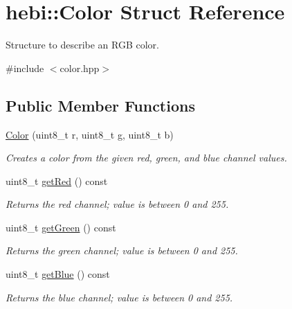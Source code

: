 \hypertarget{structhebi_1_1Color}{}\section{hebi\+:\+:Color Struct Reference}
\label{structhebi_1_1Color}


Structure to describe an R\+GB color.  




{\ttfamily \#include $<$color.\+hpp$>$}

\subsection*{Public Member Functions}
\begin{DoxyCompactItemize}
\item 
\hyperlink{structhebi_1_1Color_aa7cad37a99b993eea058d455bbcc4a82}{Color} (uint8\+\_\+t r, uint8\+\_\+t g, uint8\+\_\+t b)
\begin{DoxyCompactList}\small\item\em Creates a color from the given red, green, and blue channel values. \end{DoxyCompactList}\item 
uint8\+\_\+t \hyperlink{structhebi_1_1Color_a0f5728a26e280c12c89992db7d7731e3}{get\+Red} () const \hypertarget{structhebi_1_1Color_a0f5728a26e280c12c89992db7d7731e3}{}\label{structhebi_1_1Color_a0f5728a26e280c12c89992db7d7731e3}

\begin{DoxyCompactList}\small\item\em Returns the red channel; value is between 0 and 255. \end{DoxyCompactList}\item 
uint8\+\_\+t \hyperlink{structhebi_1_1Color_a8b341796a580fffd29c20fc75efe8163}{get\+Green} () const \hypertarget{structhebi_1_1Color_a8b341796a580fffd29c20fc75efe8163}{}\label{structhebi_1_1Color_a8b341796a580fffd29c20fc75efe8163}

\begin{DoxyCompactList}\small\item\em Returns the green channel; value is between 0 and 255. \end{DoxyCompactList}\item 
uint8\+\_\+t \hyperlink{structhebi_1_1Color_ae35357f7eaacd06d2857b027adeed1d6}{get\+Blue} () const \hypertarget{structhebi_1_1Color_ae35357f7eaacd06d2857b027adeed1d6}{}\label{structhebi_1_1Color_ae35357f7eaacd06d2857b027adeed1d6}

\begin{DoxyCompactList}\small\item\em Returns the blue channel; value is between 0 and 255. \end{DoxyCompactList}\end{DoxyCompactItemize}


